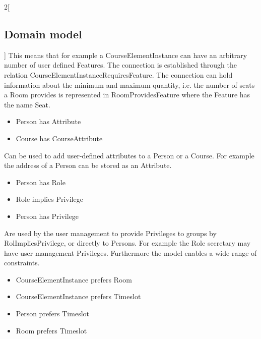 \begin{multicols}{2}[\subsection{Domain model}]
This means that for example a CourseElementInstance can have an arbitrary number of user defined Features. The connection is established through the relation CourseElementInstanceRequiresFeature. The connection can hold information about the minimum and maximum quantity, i.e. the number of seats a Room provides is represented in RoomProvidesFeature where the Feature has the name Seat.

\begin{itemize}
	\item Person has Attribute
	\item Course has CourseAttribute
\end{itemize}

Can be used to add user-defined attributes to a Person or a Course. For example the address of a Person can be stored as an Attribute.

\begin{itemize}
	\item Person has Role
	\item Role implies Privilege
	\item Person has Privilege
\end{itemize}

Are used by the user management to provide Privileges to groups  by RolImpliesPrivilege, or directly to Persons. For example the Role secretary may have user management Privileges. Furthermore the model enables a wide range of constraints.

\begin{itemize}
\item CourseElementInstance prefers Room

\item CourseElementInstance prefers Timeslot

\item Person prefers Timeslot

\item Room prefers Timeslot
\end{itemize}


\end{multicols}
